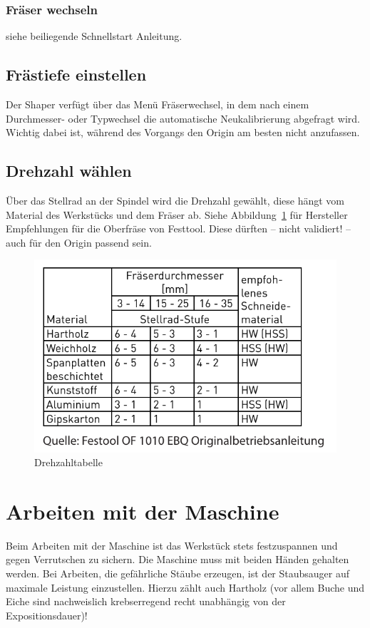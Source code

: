 \documentclass{\basedir/fablab-document}
\begin{document}
\subsubsection{Fräser wechseln}
siehe beiliegende Schnellstart Anleitung.

\subsection{Frästiefe einstellen}
Der Shaper verfügt über das Menü Fräserwechsel, in dem nach einem Durchmesser-
oder Typwechsel die automatische Neukalibrierung abgefragt wird. Wichtig dabei
ist, während des Vorgangs den Origin am besten nicht anzufassen.

\subsection{Drehzahl wählen}
Über das Stellrad an der Spindel wird die Drehzahl gewählt, diese hängt vom
Material des Werkstücks und dem Fräser ab. Siehe Abbildung~\ref{fig:drehzahl}
für Hersteller Empfehlungen für die Oberfräse von Festtool. Diese dürften
-- nicht validiert! -- auch für den Origin passend sein.
\begin{figure}[h!]
    \centering
    \includegraphics{img/drehzahltabelle.pdf}
    \caption{Drehzahltabelle}
    \label{fig:drehzahl}
\end{figure}

\section{Arbeiten mit der Maschine}
Beim Arbeiten mit der Maschine ist das Werkstück stets festzuspannen
und gegen Verrutschen zu sichern. Die Maschine muss mit beiden Händen gehalten
werden. Bei Arbeiten, die gefährliche Stäube erzeugen, ist der Staubsauger
auf maximale Leistung einzustellen. Hierzu zählt auch Hartholz (vor allem
Buche und Eiche sind nachweislich krebserregend recht unabhängig von der Expositionsdauer)!
\end{document}
